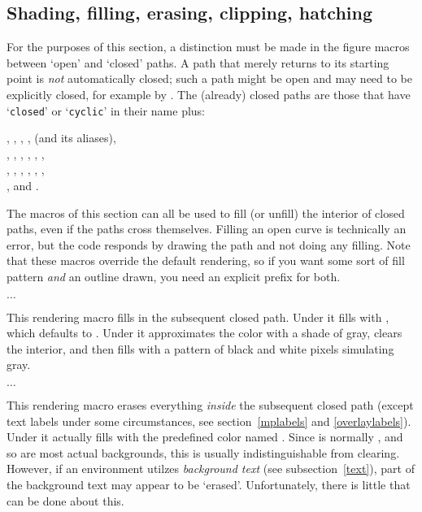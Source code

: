 \documentclass[letterpaper]{article}
\begin{document}
\subsection{Shading, filling, erasing, clipping, hatching}\label{filling}

For the purposes of this section, a distinction must be made in the
figure macros between `open' and `closed' paths. A path that merely
returns to its starting point is \emph{not} automatically closed; such a
path might be open and may need to be explicitly closed, for example by
. The (already) closed paths are those that have
`\texttt{closed}' or `\texttt{cyclic}' in their name plus:
\begin{display}
  , , , ,
     (and its aliases),\\
  , , , ,
    , ,\\
  , , , ,
    , ,\\
  , and .
\end{display}

The macros of this section can all be used to fill (or unfill) the
interior of closed paths, even if the paths cross themselves. Filling an
open curve is technically an error, but the \MF{} code responds by
drawing the path and not doing any filling. Note that these macros
override the default rendering, so if you want some sort of fill pattern
\emph{and} an outline drawn, you need an explicit prefix for both.

\begin{cd}
$\ldots$%
\end{cd}

This rendering macro fills in the subsequent closed path. Under \MP{} it
fills with , which defaults to
. Under \MF{} it
approximates the color with a shade of gray, clears the interior, and
then fills with a pattern of black and white pixels simulating gray.

\begin{cd}
$\ldots$%
\end{cd}

This rendering macro erases everything \emph{inside} the subsequent
closed path (except text labels under some circumstances, see
section~\ref{mplabels} and \ref{overlaylabels}). Under \MP{} it actually
fills with the predefined color named . Since
 is normally , and so are most actual
backgrounds, this is usually indistinguishable from clearing. However,
if an  environment utilzes \emph{background text} (see
subsection~\ref{text}), part of the background text may appear to be
`erased'. Unfortunately, there is little that can be done about this.
\end{document}

